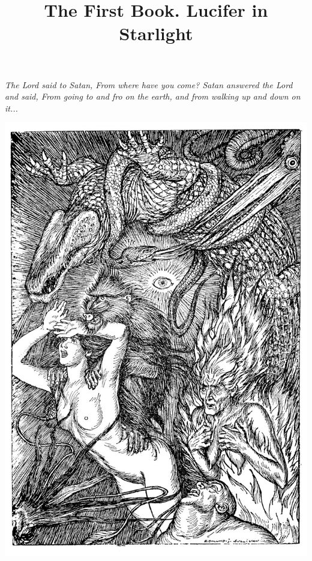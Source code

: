 \documentclass{amsbook}
\title{The First Book. Lucifer in Starlight}
\begin{document}
    \frontmatter
    \renewcommand\thefootnote{{}}
    \maketitle

    \thispagestyle{empty}
    \vspace*{\fill}
    \noindent \textit{The Lord said to Satan, From where have you come? Satan answered the Lord and said, From going to and fro on the earth, and from walking up and down on it...}
    \vspace*{\fill}
    \clearpage

    \tableofcontents

    \thispagestyle{empty}
    \vspace*{\fill}
    {\centering
    \includegraphics[width=\textwidth]{images/rubaiyat.jpg}}
    \vspace*{\fill}
    \clearpage
\end{document}
